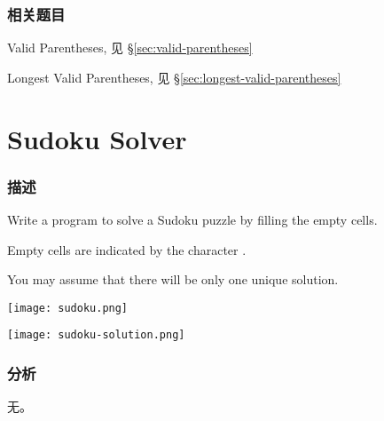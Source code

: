 \subsubsection{相关题目}
\begindot
\item Valid Parentheses, 见 \S \ref{sec:valid-parentheses}
\item Longest Valid Parentheses, 见 \S \ref{sec:longest-valid-parentheses}
\myenddot


\section{Sudoku Solver} %
\label{sec:sudoku-solver}


\subsubsection{描述}
Write a program to solve a Sudoku puzzle by filling the empty cells.

Empty cells are indicated by the character .

You may assume that there will be only one unique solution.

\begin{center}
\texttt{[image: sudoku.png]}\\
\label{fig:sudoku}
\end{center}

\begin{center}
\texttt{[image: sudoku-solution.png]}\\
\label{fig:sudoku-solution}
\end{center}


\subsubsection{分析}
无。


